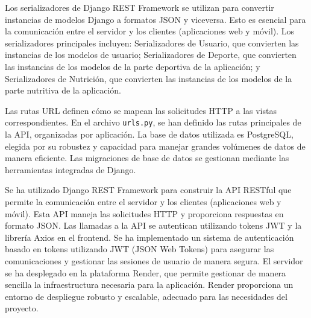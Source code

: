 Los serializadores  de Django REST Framework se utilizan para convertir instancias de modelos Django a formatos JSON y viceversa. Esto es esencial para la comunicación entre el servidor y los clientes (aplicaciones web y móvil). Los serializadores principales incluyen: Serializadores de Usuario, que convierten las instancias de los modelos de usuario; Serializadores de Deporte, que convierten las instancias de los modelos de la parte deportiva de la aplicación; y Serializadores de Nutrición, que convierten las instancias de los modelos de la parte nutritiva de la aplicación.

Las rutas URL  definen cómo se mapean las solicitudes HTTP a las vistas correspondientes. En el archivo \texttt{urls.py}, se han definido las rutas principales de la API, organizadas por aplicación. La base de datos  utilizada es PostgreSQL, elegida por su robustez y capacidad para manejar grandes volúmenes de datos de manera eficiente. Las migraciones de base de datos se gestionan mediante las herramientas integradas de Django.

Se ha utilizado Django REST Framework para construir la API RESTful  que permite la comunicación entre el servidor y los clientes (aplicaciones web y móvil). Esta API maneja las solicitudes HTTP y proporciona respuestas en formato JSON. Las llamadas a la API  se autentican utilizando tokens JWT \cite{JWT} y la librería Axios \cite{Axios} en el frontend. Se ha implementado un sistema de autenticación basado en tokens utilizando JWT (JSON Web Tokens) para asegurar las comunicaciones y gestionar las sesiones de usuario de manera segura. El servidor se ha desplegado en la plataforma Render, que permite gestionar de manera sencilla la infraestructura necesaria para la aplicación. Render proporciona un entorno de despliegue robusto y escalable, adecuado para las necesidades del proyecto.